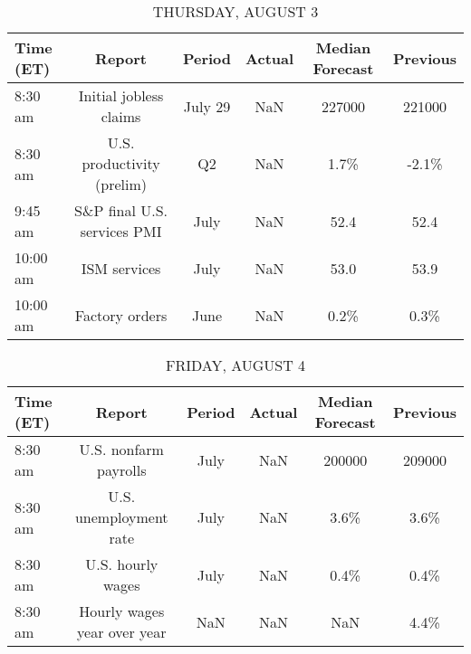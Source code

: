 \documentclass{article}%
\begin{document}
%


\begin{table}[htbp]%
\caption{THURSDAY, AUGUST 3}%
\centering%
\begin{adjustbox}{width=1\textwidth}%
\begin{tabular}{lccccc}
\toprule
Time (ET) &                      Report &  Period & Actual & Median Forecast & Previous \\
\midrule
  8:30 am &      Initial jobless claims & July 29 &    NaN &          227000 &   221000 \\
  8:30 am &  U.S. productivity (prelim) &      Q2 &    NaN &            1.7\% &    -2.1\% \\
  9:45 am & S\&P final U.S. services PMI &    July &    NaN &            52.4 &     52.4 \\
 10:00 am &                ISM services &    July &    NaN &            53.0 &     53.9 \\
 10:00 am &              Factory orders &    June &    NaN &            0.2\% &     0.3\% \\
\bottomrule
\end{tabular}
%
\end{adjustbox}%
\end{table}

%


\begin{table}[htbp]%
\caption{FRIDAY, AUGUST 4}%
\centering%
\begin{adjustbox}{width=1\textwidth}%
\begin{tabular}{lccccc}
\toprule
Time (ET) &                      Report & Period & Actual & Median Forecast & Previous \\
\midrule
  8:30 am &       U.S. nonfarm payrolls &   July &    NaN &          200000 &   209000 \\
  8:30 am &      U.S. unemployment rate &   July &    NaN &            3.6\% &     3.6\% \\
  8:30 am &           U.S. hourly wages &   July &    NaN &            0.4\% &     0.4\% \\
  8:30 am & Hourly wages year over year &    NaN &    NaN &             NaN &     4.4\% \\
\bottomrule
\end{tabular}
%
\end{adjustbox}%
\end{table}
\end{document}

